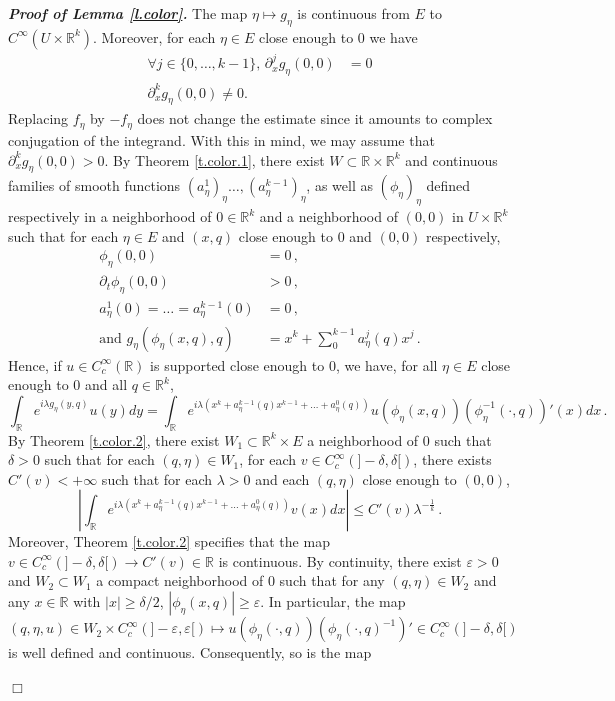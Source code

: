\documentclass[10pt,twoside]{article}
\newcommand{\eps}{\varepsilon}
\newcommand{\R}{\mathbb{R}}
\newenvironment{prf}[1][]
{\vskip 2mm  {\it \bf Proof#1. }}{$\Box$ \vskip 2mm}
\numberwithin{theorem}{section}
\begin{document}
\begin{prf}[ of Lemma \ref{l.color}]
The map $\eta\mapsto g_\eta$ is continuous from $E$ to $C^\infty(U\times \R^k)$. Moreover, for each $\eta\in E$ close enough to $0$ we have
\begin{align*}
\forall j\in\{0,\dots,k-1\},\, \partial_x^jg_\eta(0,0)&=0\\
\partial_x^kg_\eta(0,0)\neq 0.
\end{align*}
Replacing $f_\eta$ by $-f_\eta$ does not change the estimate since it amounts to complex conjugation of the integrand. With this in mind, we may assume that $\partial_x^kg_\eta(0,0)>0$. By Theorem \ref{t.color.1}, there exist $W\subset\R\times\R^k$ and continuous families of smooth functions $(a^1_\eta)_\eta\dots,(a^{k-1}_\eta)_\eta$, as well as $(\phi_\eta)_\eta$ defined respectively in a neighborhood of $0\in\R^k$ and a neighborhood of $(0,0)$ in $U\times\R^k$ such that for each $\eta\in E$ and $(x,q)$ close enough to $0$ and $(0,0)$ respectively,
\begin{align*}
\phi_\eta(0,0)&=0\, ,\\
\partial_t\phi_\eta(0,0)&>0\, ,\\
a^1_\eta(0)=\dots=a^{k-1}_\eta(0)&=0\, ,\\
\text{and }g_\eta(\phi_\eta(x,q),q)&=x^k+\sum_0^{k-1}a^j_\eta(q)x^j\, .
\end{align*}
Hence, if $u\in C^\infty_c(\R)$ is supported close enough to $0$, we have, for all $\eta\in E$ close enough to $0$ and all $q\in\R^k$,
\[
\int_\R e^{i\lambda g_\eta(y,q)}u(y)dy=\int_\R e^{i\lambda(x^k+a^{k-1}_\eta(q) x^{k-1}+\dots + a^0_\eta(q))}u(\phi_\eta(x,q))\left(\phi_\eta^{-1}(\cdot,q)\right)'(x)dx\, .
\]
By Theorem \ref{t.color.2}, there exist $W_1\subset \R^k\times E$ a neighborhood of $0$ such that $\delta>0$ such that for each $(q,\eta)\in W_1$, for each $v\in C^\infty_c\left(]-\delta,\delta[\right)$, there exists $C'(v)<+\infty$ such that for each $\lambda>0$ and each $(q,\eta)$ close enough to $(0,0)$,
\[
\left|\int_\R e^{i\lambda(x^k+a^{k-1}_\eta(q)x^{k-1}+\dots+a_\eta^0(q))}v(x)dx\right|\leq C'(v)\lambda^{-\frac{1}{k}}\, .
\]
Moreover, Theorem \ref{t.color.2} specifies that the map $v\in C^\infty_c\left(]-\delta,\delta[\right)\rightarrow C'(v)\in\R$ is continuous. By continuity, there exist $\eps>0$ and $W_2\subset W_1$ a compact neighborhood of $0$ such that for any $(q,\eta)\in W_2$ and any $x\in\R$ with $|x|\geq\delta/2$, $|\phi_\eta(x,q)|\geq\eps$. In particular, the map $(q,\eta,u)\in W_2\times C^\infty_c\left(]-\eps,\eps[\right)\mapsto u(\phi_\eta(\cdot,q))\left(\phi_\eta(\cdot,q)^{-1}\right)'\in C^\infty_c\left(]-\delta,\delta[\right)$ is well defined and continuous. Consequently, so is the map

\end{prf}
\end{document}
